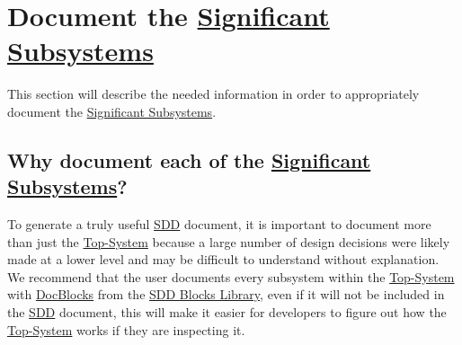\documentclass{mcscert}
\newcommand{\topsystemnolink}{Top-System} %
\newcommand{\topsystem}{\hyperref[def:topsystem]{\topsystemnolink{}}}
\newcommand{\sigsubsnolink}{Significant Subsystems} %
\newcommand{\sigsubs}{\hyperref[def:sigsubs]{\sigsubsnolink{}}}
\newcommand{\docblockslink}{\hyperref[def:docblock]{\textsf{DocBlocks}}}
\begin{document}


\section{Document the \sigsubs{}}
\label{sec:sigsubs-docblocks}
This section will describe the needed information in order to appropriately document the \sigsubs{}.

	\subsection{Why document each of the \sigsubs{}?}
	To generate a truly useful \hyperref[acr:sdd]{SDD} document, it is important to document more than just the \topsystem{} because a large number of design decisions were likely made at a lower level and may be difficult to understand without explanation. 
	We recommend that the user documents every subsystem within the \topsystem{} with \docblockslink{} from the \hyperref[ssec:SDD-Blocks-Lib]{SDD Blocks Library}, even if it will not be included in the \hyperref[acr:sdd]{SDD} document, this will make it easier for developers to figure out how the \topsystem{} works if they are inspecting it.
\end{document}
